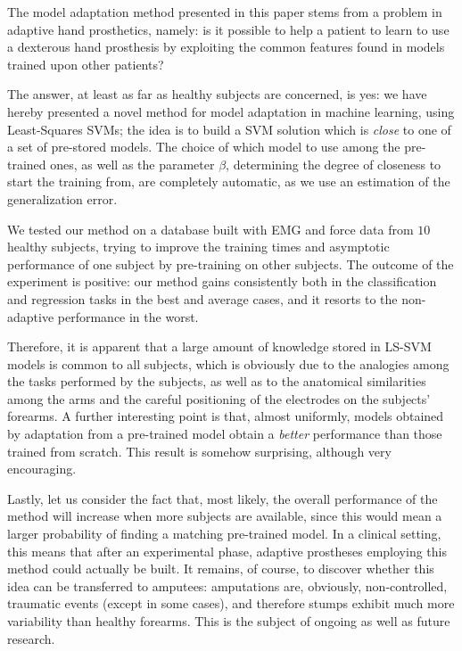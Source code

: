 The model adaptation method presented in this paper stems from a
problem in adaptive hand prosthetics, namely: is it possible to help a
patient to learn to use a dexterous hand prosthesis 
by exploiting the common features found in models trained upon other
patients?

The answer, at least as far as healthy subjects are concerned, is yes:
we have hereby presented a novel method for model adaptation in
machine learning, using Least-Squares SVMs; the idea is to build a SVM
solution which is \emph{close} to one of a set of pre-stored
models. The choice of which model to use among the pre-trained ones,
as well as the parameter $\beta$, determining the degree of closeness
to start the training from, are completely automatic, as we use an
estimation of the generalization error.

We tested our method on a database built with EMG and force data from
$10$ healthy subjects, trying to improve the training times and
asymptotic performance of one subject by pre-training on other
subjects. The outcome of the experiment is positive: our method gains
consistently both in the classification and regression tasks in the
best and average cases, and it resorts to the non-adaptive performance
in the worst.

Therefore, it is apparent that a large amount of knowledge stored in
LS-SVM models is common to all subjects, which is obviously due to the
analogies among the tasks performed by the subjects, as well as to the
anatomical similarities among the arms and the careful positioning of
the electrodes on the subjects' forearms. A further interesting point
is that, almost uniformly, models obtained by adaptation from a
pre-trained model obtain a \emph{better} performance than those
trained from scratch. This result is somehow surprising, although very
encouraging.

Lastly, let us consider the fact that, most likely, the overall
performance of the method will increase when more subjects are
available, since this would mean a larger probability of finding a
matching pre-trained model. In a clinical setting, this means that
after an experimental phase, adaptive prostheses employing this method
could actually be built. It remains, of course, to discover whether
this idea can be transferred to amputees: amputations are, obviously,
non-controlled, traumatic events (except in some cases), and therefore
stumps exhibit much more variability than healthy forearms. This is
the subject of ongoing as well as future research.
